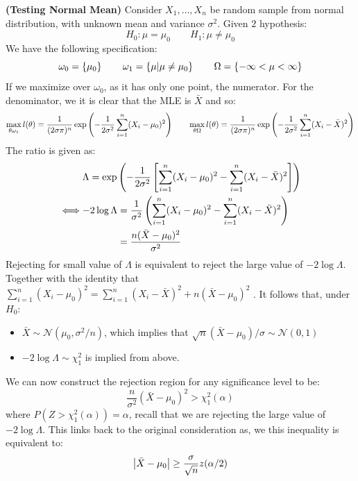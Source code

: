 \begin{example}{\textbf{(Testing Normal Mean)}}
    Consider $X_1,\dots,X_n$ be random sample from normal distribution, with unknown mean and variance $\sigma^2$. Given $2$ hypothesis:
    \begin{equation*}
        H_0 : \mu = \mu_0 \qquad H_1 : \mu \ne \mu_0
    \end{equation*}
    We have the following specification:
    \begin{equation*}
        \omega_0 = \left\{ \mu_0 \right\} \qquad \omega_1 = \left\{ \mu|\mu\ne\mu_0 \right\} \qquad \Omega = \left\{ -\infty < \mu < \infty \right\}
    \end{equation*}
    If we maximize over $\omega_0$, as it has only one point, the numerator. For the denominator, we it is clear that the MLE is $\bar{X}$ and so:
    \begin{equation*}
        \max_{\theta \omega_1}l(\theta) = \frac{1}{(2\sigma\pi)^n}\exp\left( -\frac{1}{2\sigma^2}\sum^n_{i=1}(X_i - \mu_0)^2 \right) \qquad 
        \max_{\theta \Omega}l(\theta) = \frac{1}{(2\sigma\pi)^n}\exp\left( -\frac{1}{2\sigma^2}\sum^n_{i=1}(X_i - \bar{X})^2 \right)
    \end{equation*}
    The ratio is given as:
    \begin{equation*}
    \begin{aligned}
        &\Lambda = \exp\left( -\frac{1}{2\sigma^2}\left[ \sum^n_{i=1}(X_i - \mu_0)^2 - \sum^n_{i=1}(X_i - \bar{X})^2  \right] \right) \\
        \iff& \begin{aligned}[t]
            -2\log\Lambda &= \frac{1}{\sigma^2}\left( \sum^n_{i=1}(X_i-\mu_0)^2 - \sum^n_{i=1}(X_i-\bar{X})^2 \right)\\
            &= \frac{n(\bar{X} - \mu_0)^2}{\sigma^2}
        \end{aligned}
    \end{aligned}
    \end{equation*}
    Rejecting for small value of $\Lambda$ is equivalent to reject the large value of $-2\log\Lambda$. Together with the identity that $\sum^n_{i=1}(X_i-\mu_0)^2 = \sum^n_{i=1}(X_i - \bar{X})^2 + n(\bar{X} - \mu_0)^2$ . It follows that, under $H_0$:
    \begin{itemize}
        \item $\bar{X} \sim \mathcal{N}(\mu_0, \sigma^2/n)$, which implies that $\sqrt{n}(\bar{X}-\mu_0)/\sigma\sim\mathcal{N}(0, 1)$ 
        \item $-2\log\Lambda\sim\chi^2_1$ is implied from above. 
    \end{itemize}
    We can now construct the rejection region for any significance level to be:
    \begin{equation*}
        \frac{n}{\sigma^2}(\bar{X} - \mu_0)^2 > \chi^2_1(\alpha)
    \end{equation*}
    where $P(Z > \chi^2_1(\alpha)) = \alpha$, recall that we are rejecting the large value of $-2\log \Lambda$. This links back to the original consideration as, we this inequality is equivalent to:
    \begin{equation*}
        \left| \bar{X}-\mu_0 \right| \ge \frac{\sigma}{\sqrt{n}}z(\alpha/2)
    \end{equation*}
\end{example}

